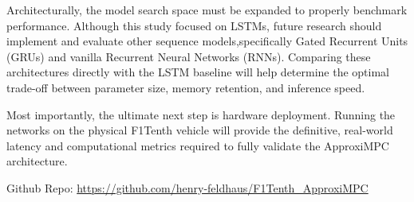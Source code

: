 \documentclass[conference]{IEEEtran}
\begin{document}
Architecturally, the model search space must be expanded to properly benchmark performance. Although this study focused on LSTMs, future research should implement and evaluate other sequence models,specifically Gated Recurrent Units (GRUs) and vanilla Recurrent Neural Networks (RNNs). Comparing these architectures directly with the LSTM baseline will help determine the optimal trade-off between parameter size, memory retention, and inference speed.

Most importantly, the ultimate next step is hardware deployment. Running the networks on the physical F1Tenth vehicle will provide the definitive, real-world latency and computational metrics required to fully validate the ApproxiMPC architecture.




\appendix

Github Repo: \url{https://github.com/henry-feldhaus/F1Tenth_ApproxiMPC} 
\end{document}
